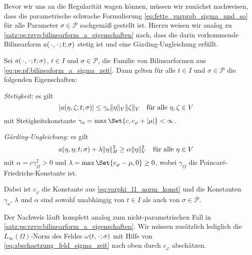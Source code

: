 Bevor wir uns an die Regularität wagen können, müssen wir zunächst nachweisen, dass die parametrische schwache Formulierung \cref{eq:fette_varprob_sigma_und_so} für alle Parameter $\sigma \in \mathcal P$ sachgemäß gestellt ist.
Hierzu weisen wir analog zu \cref{satz:ps:rzvp:bilinearform_a_eigenschaften} nach, dass die darin vorkommende Bilinearform $a({\mkern2mu\cdot\mkern2mu}, {\mkern2mu\cdot\mkern2mu}; t; \sigma)$ stetig ist und eine G\aa{}rding-Ungleichung erfüllt.

\begin{Satz}
\label{satz:bf_a_param_stetig_garding}
    Sei $a({\mkern2mu\cdot\mkern2mu}, {\mkern2mu\cdot\mkern2mu}; t; \sigma)$, $t \in I$ und $\sigma \in \mathcal P$, die Familie von Bilinearformen aus \cref{eq:ps:pf:bilineaform_a_sigma_zeit}.
    Dann gelten für alle $t \in I$ und $\sigma \in \mathcal P$ die folgenden Eigenschaften:
    \begin{thmenumerate}
        \item\label{satz:ps:rzvp:bilinearform_a_eigenschaften_stetig}
        \emph{Stetigkeit:} es gilt
        \begin{equation}
            \label{eq:ps:rzvp:bilinearform_a_eigenschaften_stetig}
            \lvert a(\eta, \zeta; t; \sigma)\rvert \leq \gamma_{a} \lVert\eta\rVert_{V} \lVert\zeta\rVert_{V} \quad \text{für alle}~\eta, \zeta \in V
        \end{equation}
        mit Stetigkeitskonstante $\gamma_{a} = \max\Set{c, c_{\varphi} + \abs{\mu}} < \infty$.
        \item\label{satz:ps:rzvp:bilinearform_a_eigenschaften_garding}
        \emph{G\aa{}rding-Ungleichung:} es gilt
        \begin{equation}
            \label{eq:ps:rzvp:bilinearform_a_eigenschaften_garding}
            a(\eta, \eta; t; \sigma) + \lambda \lVert\eta\rVert_{H}^{2} \geq \alpha \lVert\eta\rVert_{V}^{2} \quad \text{für alle}~\eta \in V
        \end{equation}
        mit $\alpha = c \gamma_{\Omega}^{2} > 0$ und $\lambda = \max\Set{c_{\varphi} - \mu, 0} \geq 0$, wobei $\gamma_{\Omega}$ die Poincaré-Friedrichs-Konstante ist.
    \end{thmenumerate}
    Dabei ist $c_{\varphi}$ die Konstante aus \cref{eq:varphi_l1_norm_konst} und die Konstanten $\gamma_{a}$, $\lambda$ und $\alpha$ sind sowohl unabhängig von $t \in I$ als auch von $\sigma \in \mathcal P$.

    \begin{Beweis}
        Der Nachweis läuft komplett analog zum nicht-parametrischen Fall in \cref{satz:ps:rzvp:bilinearform_a_eigenschaften}.
        Wir müssen zusätzlich lediglich die $L_{\infty}(\Omega)$-Norm des Feldes $\omega(t, {\mkern2mu\cdot\mkern2mu}; \sigma)$ mit Hilfe von \cref{eq:abschaetzung_feld_sigma_zeit} nach oben durch $c_{\varphi}$ abschätzen.
    \end{Beweis}
\end{Satz}


